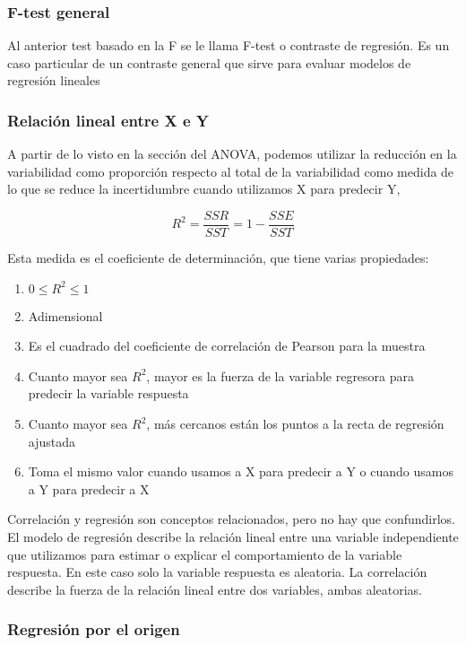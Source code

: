 \subsubsection{F-test general}

Al anterior test basado en la F se le llama F-test o contraste de regresión. Es un caso particular de un contraste general que sirve para evaluar modelos de regresión lineales

\subsubsection{Relación lineal entre X e Y}

A partir de lo visto en la sección del ANOVA, podemos utilizar la reducción en la variabilidad como proporción respecto al total de la variabilidad como medida de lo que se reduce la incertidumbre cuando utilizamos X para predecir Y,

$$
R^2=\frac{SSR}{SST}=1-\frac{SSE}{SST}
$$

Esta medida es el coeficiente de determinación, que tiene varias propiedades:
\begin{enumerate}
    \item $0\leq R^2\leq 1$
    \item Adimensional
    \item Es el cuadrado del coeficiente de correlación de Pearson para la muestra
    \item Cuanto mayor sea $R^2$, mayor es la fuerza de la variable regresora para predecir la variable respuesta
    \item Cuanto mayor sea $R^2$, más cercanos están los puntos a la recta de regresión ajustada
    \item Toma el mismo valor cuando usamos a X para predecir a Y o cuando usamos a Y para predecir a X
\end{enumerate}

Correlación y regresión son conceptos relacionados, pero no hay que confundirlos. El modelo de regresión describe la relación lineal entre una variable independiente que utilizamos para estimar o explicar el comportamiento de la variable respuesta. En este caso solo la variable respuesta es aleatoria.
La correlación describe la fuerza de la relación lineal entre dos variables, ambas aleatorias.

\subsubsection{Regresión por el origen}

